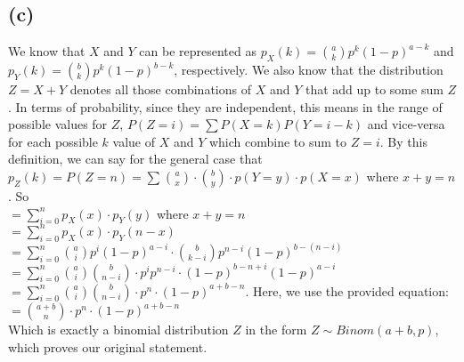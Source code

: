 \documentclass{article}
\begin{document}
{\subsection*{(c)}
We know that $X$ and $Y$ can be represented as $p_X (k) = \binom{a}{k}p^k(1-p)^{a-k}$ and $p_Y (k) = \binom{b}{k}p^k(1-p)^{b-k}$, respectively. We also know that the distribution $Z = X + Y$ denotes all those combinations of $X$ and $Y$ that add up to some sum $Z$. In terms of probability, since they are independent, this means in the range of possible values for $Z$, $P(Z = i) = \sum P(X = k)P(Y = i - k)$ and vice-versa for each possible $k$ value of $X$ and $Y$ which combine to sum to $Z = i$. By this definition, we can say for the general case that \\ 
$p_Z (k) = P(Z = n) = \sum_{} \binom{a}{x} \cdot \binom{b}{y} \cdot p(Y = y) \cdot p(X = x)$ where $x + y = n$. So \\
$= \sum_{i=0}^{n} p_X(x) \cdot p_Y(y)$ where $x + y = n$ \\
$= \sum_{i=0}^{n} p_X(x) \cdot p_Y(n - x)$ \\
$= \sum_{i=0}^{n} \binom{a}{i} p^i(1-p)^{a-i} \cdot \binom{b}{k - i} p^{n-i}(1-p)^{b - (n-i)}$ \\
$= \sum_{i=0}^{n} \binom{a}{i} \binom{b}{n - i} \cdot p^i p^{n-i} \cdot (1-p)^{b - n + i} (1-p)^{a-i}$ \\
$= \sum_{i=0}^{n} \binom{a}{i} \binom{b}{n - i} \cdot p^n \cdot (1-p)^{a + b - n}$.    Here, we use the provided equation: \\
$= \binom{a + b}{n} \cdot p^n \cdot (1-p)^{a + b - n}$ \\
Which is exactly a binomial distribution $Z$ in the form $Z \sim Binom(a + b, p)$, which proves our original statement.

}
\end{document}
